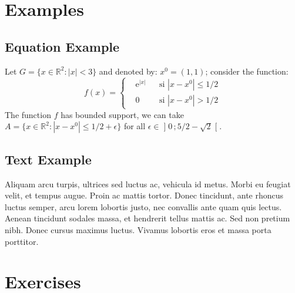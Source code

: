 \documentclass[
	11pt, %
	fleqn, %
	a4paper, %
]{LegrandOrangeBook}
\begin{document}

\section{Examples}

\subsection{Equation Example}

\begin{example} %
	Let $G=\{x\in\mathbb{R}^2:|x|<3\}$ and denoted by: $x^0=(1,1)$; consider the function:
	\begin{equation}
	f(x)=\left\{\begin{aligned} & \mathrm{e}^{|x|} & & \text{si $|x-x^0|\leq 1/2$}\\
	& 0 & & \text{si $|x-x^0|> 1/2$}\end{aligned}\right.
	\end{equation}
	The function $f$ has bounded support, we can take $A=\{x\in\mathbb{R}^2:|x-x^0|\leq 1/2+\epsilon\}$ for all $\epsilon\in\mathopen{]}0\,;5/2-\sqrt{2}\mathclose{[}$.
\end{example}

\subsection{Text Example}

\begin{example}[Example name] %
	Aliquam arcu turpis, ultrices sed luctus ac, vehicula id metus. Morbi eu feugiat velit, et tempus augue. Proin ac mattis tortor. Donec tincidunt, ante rhoncus luctus semper, arcu lorem lobortis justo, nec convallis ante quam quis lectus. Aenean tincidunt sodales massa, et hendrerit tellus mattis ac. Sed non pretium nibh. Donec cursus maximus luctus. Vivamus lobortis eros et massa porta porttitor.
\end{example}


\section{Exercises}
\end{document}
